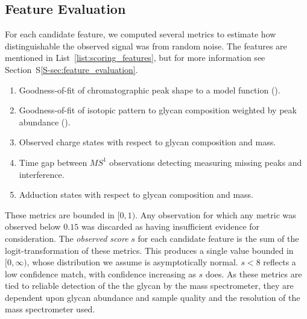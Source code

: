 \subsection{Feature Evaluation}
        For each candidate feature, we computed several metrics to estimate
    how distinguishable the observed signal was from random noise. The
    features are mentioned in List~\ref{list:scoring_features}, but for more
    information see Section~S\ref{S-sec:feature_evaluation}.
    \begin{ordlist}
    \begin{enumerate}
        \itemsep0em
        \caption{Chromatographic Feature Metrics\label{list:scoring_features}}
        \item Goodness-of-fit of chromatographic peak shape to a model function
              (\cite{Yu2010,Kronewitter2014}).
        \item Goodness-of-fit of isotopic pattern to glycan composition weighted
              by peak abundance (\cite{Maxwell2012}).
        \item Observed charge states with respect to glycan composition and mass.
        \item Time gap between $MS^1$ observations detecting measuring missing peaks
              and interference.
        \item Adduction states with respect to glycan composition and mass.
    \end{enumerate}
    \end{ordlist}

        These metrics are bounded in $[0, 1)$. Any observation for which any metric
    was observed below $0.15$ was discarded as having insufficient evidence for
    consideration. The \textit{observed score} $s$ for each candidate feature is
    the sum of the logit-transformation of these metrics. This produces a single
    value bounded in $[0, \infty)$, whose distribution we assume is asymptotically
    normal. $s < 8$ reflects a low confidence match, with confidence increasing
    as $s$ does. As these metrics are tied to reliable detection of the the glycan
    by the mass spectrometer, they are dependent upon glycan abundance and sample
    quality and the resolution of the mass spectrometer used.
